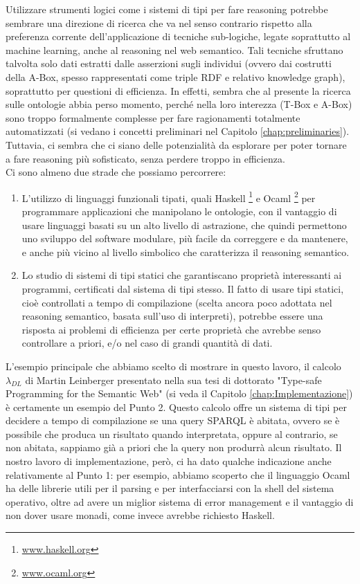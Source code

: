 Utilizzare strumenti logici come i sistemi di tipi per fare reasoning potrebbe sembrare una direzione di ricerca che va nel senso contrario 
rispetto alla preferenza corrente dell'applicazione di tecniche sub-logiche, legate soprattutto al machine learning, anche al reasoning nel web 
semantico. Tali tecniche sfruttano talvolta solo dati estratti dalle asserzioni sugli individui (ovvero dai costrutti della A-Box, spesso rappresentati 
come triple RDF e relativo knowledge graph), soprattutto per questioni di efficienza. In effetti, sembra che al presente  la ricerca sulle ontologie abbia 
perso momento, perché nella loro interezza (T-Box e A-Box) sono troppo formalmente complesse per fare ragionamenti totalmente automatizzati (si vedano i 
concetti preliminari nel Capitolo \ref{chap:preliminaries}). Tuttavia, ci sembra che ci siano delle potenzialità da esplorare per poter tornare a fare reasoning più 
sofisticato, senza perdere troppo in efficienza.
\\
Ci sono almeno due strade che possiamo percorrere:
\begin{enumerate}
    \item L'utilizzo di linguaggi funzionali tipati, quali Haskell \footnote{\url{www.haskell.org}} e Ocaml \footnote{\url{www.ocaml.org}} per programmare applicazioni che manipolano le ontologie, con il 
        vantaggio di usare linguaggi basati su un alto livello di astrazione, che quindi permettono uno sviluppo del software modulare, più facile da correggere e da 
        mantenere, e anche più vicino al livello simbolico che caratterizza il reasoning semantico. 
    \item Lo studio di sistemi di tipi statici che garantiscano proprietà 
        interessanti ai programmi, certificati dal sistema di tipi stesso. Il fatto di usare tipi statici, cioè controllati a tempo di compilazione (scelta ancora 
        poco adottata nel reasoning semantico, basata sull'uso di interpreti), potrebbe essere una risposta ai problemi di efficienza per certe proprietà che avrebbe 
        senso controllare a priori, e/o nel caso di grandi quantità di dati.
\end{enumerate}

L'esempio principale che abbiamo scelto di mostrare in questo lavoro, il calcolo $\lambda_{DL}$ di Martin Leinberger presentato nella sua tesi di dottorato 
"Type-safe Programming for the Semantic Web" \cite{leinbergerphdthesis} (si veda il Capitolo \ref{chap:Implementazione}) è certamente un esempio del Punto 2. Questo calcolo offre un sistema 
di tipi per decidere a tempo di compilazione se una query SPARQL è abitata, ovvero se è possibile che produca un risultato quando interpretata, oppure al 
contrario, se non abitata, sappiamo già a priori che la query non produrrà alcun risultato.  Il nostro lavoro di implementazione, però, ci ha dato qualche 
indicazione anche relativamente al Punto 1: per esempio, abbiamo scoperto che il linguaggio Ocaml ha delle librerie utili per il parsing e per interfacciarsi 
con la shell del sistema operativo, oltre ad avere un miglior sistema di error management e il vantaggio di non dover usare monadi, come invece avrebbe 
richiesto Haskell.

